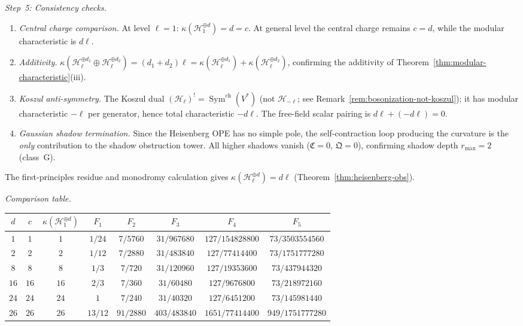 \begin{computation}
\emph{Step~5: Consistency checks.}
\begin{enumerate}[label=(\roman*)]
\item \emph{Central charge comparison.}
At level $\ell = 1$:
$\kappa(\mathcal{H}_1^{\oplus d}) = d = c$.
At general level the central charge remains $c=d$, while the
modular characteristic is $d\ell$.
\item \emph{Additivity.}
$\kappa(\mathcal{H}_\ell^{\oplus d_1}
\oplus \mathcal{H}_\ell^{\oplus d_2})
= (d_1 + d_2)\ell
= \kappa(\mathcal{H}_\ell^{\oplus d_1})
+ \kappa(\mathcal{H}_\ell^{\oplus d_2})$,
confirming the additivity of
Theorem~\ref{thm:modular-characteristic}(iii).
\item \emph{Koszul anti-symmetry.}
The Koszul dual $(\mathcal{H}_\ell)^!
= \operatorname{Sym}^{\mathrm{ch}}(V^*)$
(not $\mathcal{H}_{-\ell}$; see
Remark~\ref{rem:bosonization-not-koszul}); it has modular
characteristic $-\ell$ per generator, hence total characteristic
$-d\ell$. The free-field scalar pairing is
$d\ell+(-d\ell)=0$.
\item \emph{Gaussian shadow termination.}
Since the Heisenberg OPE has no simple pole,
the self-contraction loop producing the curvature
is the \emph{only} contribution to the shadow obstruction tower.
All higher shadows vanish ($\mathfrak{C} = 0$,
$\mathfrak{Q} = 0$), confirming shadow depth
$r_{\max} = 2$ (class~G).
\end{enumerate}

The first-principles residue and monodromy calculation gives
$\kappa(\mathcal{H}_\ell^{\oplus d}) = d\ell$
(Theorem~\ref{thm:heisenberg-obs}).

\emph{Comparison table.}
\begin{center}
\renewcommand{\arraystretch}{1.3}
\begin{tabular}{c|ccccccc}
$d$ & $c$ & $\kappa(\mathcal H_1^{\oplus d})$ & $F_1$ & $F_2$ & $F_3$ & $F_4$ & $F_5$ \\
\hline
$1$ & $1$ & $1$ & $1/24$ & $7/5760$ & $31/967680$ & $127/154828800$ & $73/3503554560$ \\
$2$ & $2$ & $2$ & $1/12$ & $7/2880$ & $31/483840$ & $127/77414400$ & $73/1751777280$ \\
$8$ & $8$ & $8$ & $1/3$ & $7/720$ & $31/120960$ & $127/19353600$ & $73/437944320$ \\
$16$ & $16$ & $16$ & $2/3$ & $7/360$ & $31/60480$ & $127/9676800$ & $73/218972160$ \\
$24$ & $24$ & $24$ & $1$ & $7/240$ & $31/40320$ & $127/6451200$ & $73/145981440$ \\
$26$ & $26$ & $26$ & $13/12$ & $91/2880$ & $403/483840$ & $1651/77414400$ & $949/1751777280$
\end{tabular}
\end{center}


\end{computation}
